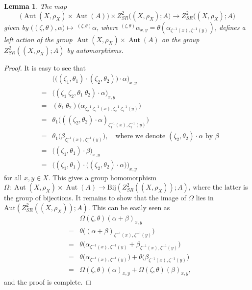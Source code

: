 \documentclass[11pt,reqno]{amsart}
\newtheorem{lemma}[theorem]{Lemma}
\theoremstyle{definition}
\numberwithin{equation}{subsection}
\begin{document}
\begin{lemma}
	The map
$$
\big(\operatorname{Aut}(X, \rho_{X}) \times \operatorname{Aut}(A) \big) \times Z_{SR}^{2} \big((X, \rho_{X}) ; A \big) \longrightarrow Z_{SR}^{2} \big((X, \rho_{X}) ; A \big)
$$
given by $\big((\zeta, \theta),  \alpha\big) \mapsto ~^{(\zeta,\theta)}\alpha$, where $^{(\zeta,\theta)}\alpha_{x, y}=\theta(\alpha_{\zeta^{-1}(x), \zeta^{-1}(y)})$, defines a left action of the group $\operatorname{Aut}(X, \rho_{X}) \times \operatorname{Aut}(A)$ on the group $Z_{SR}^{2}((X, \rho_{X}) ; A)$ by automorphisms.
\end{lemma}

\begin{proof}
It is easy to see that
\begin{eqnarray*}
		& & \big(\big((\zeta_{1}, \theta_{1}) \cdot(\zeta_{2}, \theta_{2})\big) \cdot \alpha \big)_{x, y} \\
		& =& \big((\zeta_{1} ~ \zeta_{2}, \theta_{1} ~ \theta_{2}) \cdot \alpha \big)_{x, y} \\
		&=& (\theta_{1} ~ \theta_{2})\big(\alpha_{\zeta_{2}^{-1} ~ \zeta_{1}^{-1}(x), \zeta_{2}^{-1} ~ \zeta_{1}^{-1}(y)}\big)\\
		& =&\theta_{1} \big(((\zeta_{2}, \theta_{2}) \cdot \alpha)_{\zeta_{1}^{-1}(x), \zeta_{1}^{-1}(y)} \big) \\
		& =&\theta_{1}\big(\beta_{\zeta_{1}^{-1}(x), \zeta_{1}^{-1}(y)}\big),\quad \text{where we denote $(\zeta_{2}, \theta_{2}) \cdot \alpha$ by $\beta$}\\
		&=& \big((\zeta_{1}, \theta_{1}) \cdot\beta \big)_{x, y}\\
		&=& \big((\zeta_{1}, \theta_{1}) \cdot \big((\zeta_{2}, \theta_{2}) \cdot \alpha \big) \big)_{x, y} 
	\end{eqnarray*}
for all $x, y \in X$. This gives a group homomorphism $\Omega : \operatorname{Aut}(X, \rho_{X}) \times \operatorname{Aut} (A)\longrightarrow \text{Bij}(Z_{SR}^{2}((X, \rho_{X})) ; A)$, where the latter is the group of bijections. It remains to show that the image of $\Omega$ lies in $\text{Aut}(Z_{SR}^{2}((X, \rho_{X})) ; A)$. This can be easily seen as
	\begin{eqnarray*}
		& &\Omega(\zeta,\theta)(\alpha+\beta)_{x,y} \\
		&=&\theta \big((\alpha + \beta )_{\zeta^{-1}(x),\zeta^{-1}(y)} \big)\\
		&=&\theta \big(\alpha_{\zeta^{-1}(x),\zeta^{-1}(y)} + \beta_{\zeta^{-1}(x),\zeta^{-1}(y)} \big)\\
		&=&\theta \big(\alpha_{\zeta^{-1}(x),\zeta^{-1}(y)} \big) + \theta \big(\beta_{\zeta^{-1}(x),\zeta^{-1}(y)} \big) \\
		&=&\Omega(\zeta,\theta)(\alpha)_{x,y}+\Omega(\zeta,\theta)(\beta)_{x,y},
	\end{eqnarray*}
and the proof is complete.
\end{proof}
\end{document}
